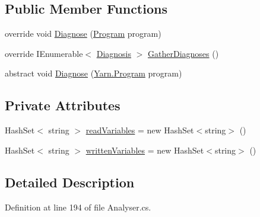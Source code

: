 \subsection*{Public Member Functions}
\begin{DoxyCompactItemize}
\item 
override void \hyperlink{a00179_aeac8f333d4dcc85f4d4a716bf8fea01f}{Diagnose} (\hyperlink{a00146}{Program} program)
\item 
override I\-Enumerable$<$ \hyperlink{a00085}{Diagnosis} $>$ \hyperlink{a00179_a107aecf707b130c4b733930a95f9154e}{Gather\-Diagnoses} ()
\item 
abstract void \hyperlink{a00047_aba4a36cb823b11ee491074e26477d084}{Diagnose} (\hyperlink{a00146}{Yarn.\-Program} program)
\end{DoxyCompactItemize}
\subsection*{Private Attributes}
\begin{DoxyCompactItemize}
\item 
Hash\-Set$<$ string $>$ \hyperlink{a00179_a6b542092ddce1b92c9455d60899518a9}{read\-Variables} = new Hash\-Set$<$string$>$ ()
\item 
Hash\-Set$<$ string $>$ \hyperlink{a00179_a0c2fe6eded1b10b135ca2469f5980a39}{written\-Variables} = new Hash\-Set$<$string$>$ ()
\end{DoxyCompactItemize}


\subsection{Detailed Description}


Definition at line 194 of file Analyser.\-cs.



